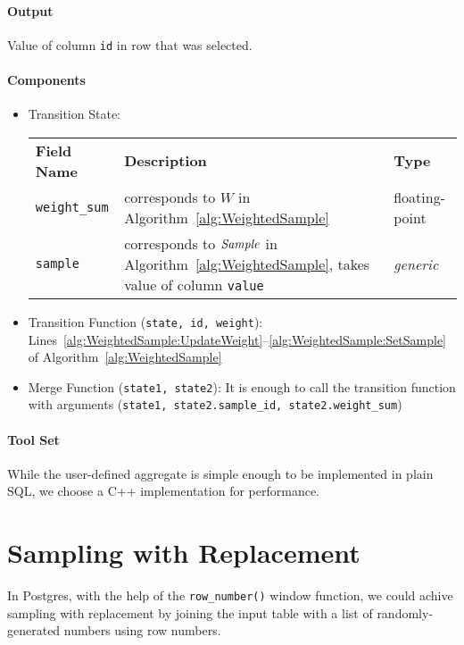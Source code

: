 \paragraph{Output}

Value of column \texttt{id} in row that was selected.

\paragraph{Components}

\begin{itemize}
	\item Transition State:
		\begin{center}
			\begin{tabularx}{\linewidth}{lXl}
				\toprule%
				\textbf{Field Name} & \textbf{Description} & \textbf{Type}
				\\\otoprule
				\texttt{weight\_sum} &
				corresponds to $W$ in Algorithm~\ref{alg:WeightedSample} &
				floating-point
				\\\midrule
				\texttt{sample} &
				corresponds to $\mathit{Sample}$ in Algorithm~\ref{alg:WeightedSample}, takes value of column \texttt{value} &
				\textit{generic}
				\\\bottomrule
			\end{tabularx}
		\end{center}
	\item Transition Function (\texttt{state, id, weight}): Lines~\ref{alg:WeightedSample:UpdateWeight}--\ref{alg:WeightedSample:SetSample} of Algorithm~\ref{alg:WeightedSample}
	\item Merge Function (\texttt{state1, state2}): It is enough to call the transition function with arguments (\texttt{state1, state2.sample\_id, state2.weight\_sum})
\end{itemize}

\paragraph{Tool Set}

While the user-defined aggregate is simple enough to be implemented in plain SQL, we choose a C++ implementation for performance. 


\section{Sampling with Replacement} %
\label{sec:SamplingWithReplacement}
In Postgres, with the help of the \texttt{row\_number()} window function, we could achive sampling with replacement by joining the input table with a list of randomly-generated numbers using row numbers.

